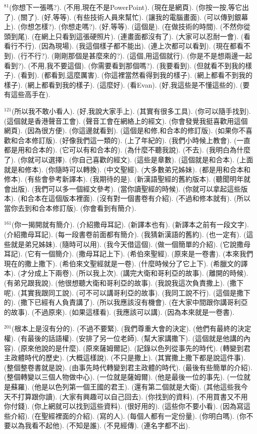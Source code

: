 \documentclass{book}
\begin{document}
$^{81}$(你想下一張嗎?).
(不用,現在不是PowerPoint).
(現在是網頁).
(你按一按,等它出了).
(關了).
(好,等等).
(有些技術人員來幫忙).
(讓我的電腦畫面).
(可以傳到銀幕上).
(你想怎樣?).
(你想走嗎?).
(好,等等).
(這個是).
(在做技術的時間).
(不然你從頭到尾).
(在網上只看到這張硬照片).
(連畫面都沒有了).
(大家可以忍耐一會).
(看看行不行).
(因為現場).
(我這個樣子都不能出).
(連上次都可以看到).
(現在都看不到).
(行不行?).
(剛剛那個是甚麼來的?).
(這個,用這個就行).
(你是不是想兩邊一起看到?).
(不用,我不要這個).
(你需要看到那個嗎?).
(我要看到).
(但就看不到我的樣子).
(看到).
(都看到,這麼厲害).
(你這裡當然看得到我的樣子).
(網上都看不到我的樣子).
(網上都看到我的樣子).
(這麼好).
(看Evan).
(好,我這些是不懂這些的).
(要有這些高手在).

$^{121}$(所以我不敢小看人).
(好,我說大家手上).
(其實有很多工具).
(你可以隨手找到).
(這個就是香港聲音工會).
(聲音工會在網絡上的經文).
(你會發覺我挺喜歡用這個網頁).
(因為很方便).
(你這邊就看到).
(這個是和修,和合本的修訂版).
(如果你不喜歡和合本修訂版).
(好像我們這一類的).
(上了年紀的).
(我們小時候上教會).
(一直都是用和合本的).
(它可以有和合本的).
(為什麼不聽我說).
(不去).
(我明白為什麼了).
(你就可以選擇).
(你自己喜歡的經文).
(這些是章數).
(這個就是和合本).
(上面就是和修本).
(你隨時可以轉換).
(中文聖經).
(大多數弟兄姊妹).
(都是用和合本和修本).
(有些會參考新譯本).
(我期待的是).
(新漢語聖經的舊約版本).
(聽聞明年就會出版).
(我們可以多一個經文參考).
(當你讀聖經的時候).
(你就可以拿起這些版本).
(和合本在這個版本裡面).
(沒有對一個書卷有介紹).
(不過和修本就有).
(所以當你去到和合本修訂版).
(你會看到有簡介).

$^{161}$(你一揭開就有簡介).
(介紹撒母耳記).
(新譯本也有).
(新譯本之前有一段文字).
(介紹撒母耳記).
(每一段書卷前面都有簡介).
(我猜新漢語的舊約).
(也一定有).
(這些就是弟兄姊妹).
(隨時可以用).
(我今天借這個).
(做一個簡單的介紹).
(它說撒母耳記).
(它有一個簡介).
(撒母耳記上下).
(希伯來聖經).
(原來是一卷書).
(本來我們現在的撒上撒下).
(希伯來文聖經就是一卷).
(什麼時候分了它上下).
(希臘文的譯本).
(才分成上下兩卷).
(所以我上次).
(講完大衛和哥利亞的故事).
(離開的時候).
(有弟兄跟我說).
(他很想聽大衛和哥利亞的故事).
(我說我這次負責撒上).
(撒下呢).
(其實我跟同工說).
(可不可以講哥利亞的故事).
(我同工說不行).
(這個是撒下的).
(撒下已經有人負責講了).
(所以我應該沒有機會).
(在大家中間跟你講哥利亞的故事).
(不過原來).
(如果這樣看).
(我應該可以講).
(因為本來就是一卷書).

$^{201}$(根本上是沒有分的).
(不過不要緊).
(我們尊重大會的決定).
(他們有最終的決定權).
(有最後的話語權).
(安排了另一位老師).
(幫大家講撒下).
(這個就是他講的內容).
(原來他說的是什麼).
(原來薩姆爾記).
(記錄以色列從事先的時代).
(轉變到君主政體時代的歷史).
(大概這樣說).
(不只是撒上).
(其實撒上撒下都是說這件事).
(整個整卷書就是說).
(由事先時代轉變到君主政體的時代).
(最後有些簡單的介紹).
(整個轉變以三個人物做中心).
(一位就是薩姆爾).
(他是最後一位的事先).
(一位就是蘇羅).
(他是以色列第一個王國的君王).
(還有第二個就是大衛).
(其他這些我今天不打算跟你讀).
(大家有興趣可以自己回去).
(你找到的資料).
(不用買書又不用你付錢).
(你上網就可以找到這些資料).
(很好用的).
(這些你不要小看).
(因為寫這些介紹).
(在聖經裡面的介紹).
(寫的人).
(每個人都有一定份量).
(你明白嗎).
(你不要以為我看不起他).
(不知是誰).
(不見經傳).
(連名字都不出).
\end{document}
